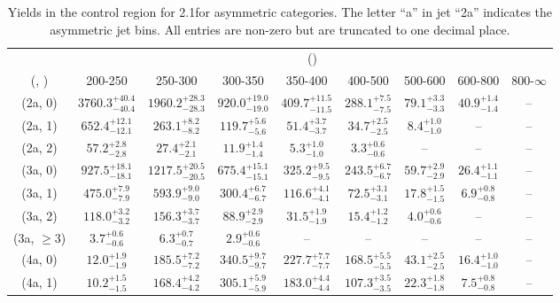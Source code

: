 \begin{table}[h!]
\tiny
\centering
\caption{Yields in the \mj control region for 2.1\ifb for asymmetric categories. The letter ``a'' in jet \eg ``2a''  indicates the asymmetric jet bins. All entries are non-zero but are truncated to one decimal place.\label{tab:yieldssep_mu_ewk_asym}}
\begin{tabular}
{ccccccccc}
	\hline\hline
	& \multicolumn{8}{c}{\scalht (\gev)} \\ 
	 (\njet,  \nb) & 200-250 & 250-300 & 300-350 & 350-400 & 400-500 & 500-600 & 600-800 & 800-$\infty$ \\ [0.8ex] 
\hline
	(2a, 0) & $3760.3^{+ 40.4 }_{- 40.4 }$ & $1960.2^{+ 28.3 }_{- 28.3 }$ & $920.0^{+ 19.0 }_{- 19.0 }$ & $409.7^{+ 11.5 }_{- 11.5 }$ & $288.1^{+ 7.5 }_{- 7.5 }$ & $79.1^{+ 3.3 }_{- 3.3 }$ & $40.9^{+ 1.4 }_{- 1.4 }$ & -- \\[0.5ex] 
	(2a, 1) & $652.4^{+ 12.1 }_{- 12.1 }$ & $263.1^{+ 8.2 }_{- 8.2 }$ & $119.7^{+ 5.6 }_{- 5.6 }$ & $51.4^{+ 3.7 }_{- 3.7 }$ & $34.7^{+ 2.5 }_{- 2.5 }$ & $8.4^{+ 1.0 }_{- 1.0 }$ & -- & -- \\[0.5ex] 
	(2a, 2) & $57.2^{+ 2.8 }_{- 2.8 }$ & $27.4^{+ 2.1 }_{- 2.1 }$ & $11.9^{+ 1.4 }_{- 1.4 }$ & $5.3^{+ 1.0 }_{- 1.0 }$ & $3.3^{+ 0.6 }_{- 0.6 }$ & -- & -- & -- \\[0.5ex] 
	(3a, 0) & $927.5^{+ 18.1 }_{- 18.1 }$ & $1217.5^{+ 20.5 }_{- 20.5 }$ & $675.4^{+ 15.1 }_{- 15.1 }$ & $325.2^{+ 9.5 }_{- 9.5 }$ & $243.5^{+ 6.7 }_{- 6.7 }$ & $59.7^{+ 2.9 }_{- 2.9 }$ & $26.4^{+ 1.1 }_{- 1.1 }$ & -- \\[0.5ex] 
	(3a, 1) & $475.0^{+ 7.9 }_{- 7.9 }$ & $593.9^{+ 9.0 }_{- 9.0 }$ & $300.4^{+ 6.7 }_{- 6.7 }$ & $116.6^{+ 4.1 }_{- 4.1 }$ & $72.5^{+ 3.1 }_{- 3.1 }$ & $17.8^{+ 1.5 }_{- 1.5 }$ & $6.9^{+ 0.8 }_{- 0.8 }$ & -- \\[0.5ex] 
	(3a, 2) & $118.0^{+ 3.2 }_{- 3.2 }$ & $156.3^{+ 3.7 }_{- 3.7 }$ & $88.9^{+ 2.9 }_{- 2.9 }$ & $31.5^{+ 1.9 }_{- 1.9 }$ & $15.4^{+ 1.2 }_{- 1.2 }$ & $4.0^{+ 0.6 }_{- 0.6 }$ & -- & -- \\[0.5ex] 
	(3a, $\ge3$) & $3.7^{+ 0.6 }_{- 0.6 }$ & $6.3^{+ 0.7 }_{- 0.7 }$ & $2.9^{+ 0.6 }_{- 0.6 }$ & -- & -- & -- & -- & -- \\[0.5ex] 
	(4a, 0) & $12.0^{+ 1.9 }_{- 1.9 }$ & $185.5^{+ 7.2 }_{- 7.2 }$ & $340.5^{+ 9.7 }_{- 9.7 }$ & $227.7^{+ 7.7 }_{- 7.7 }$ & $168.5^{+ 5.5 }_{- 5.5 }$ & $43.1^{+ 2.5 }_{- 2.5 }$ & $16.4^{+ 1.0 }_{- 1.0 }$ & -- \\[0.5ex] 
	(4a, 1) & $10.2^{+ 1.5 }_{- 1.5 }$ & $168.4^{+ 4.2 }_{- 4.2 }$ & $305.1^{+ 5.9 }_{- 5.9 }$ & $183.0^{+ 4.4 }_{- 4.4 }$ & $107.3^{+ 3.5 }_{- 3.5 }$ & $22.3^{+ 1.8 }_{- 1.8 }$ & $7.5^{+ 0.8 }_{- 0.8 }$ & -- \\[0.5ex] 

\end{tabular}
\end{table}
